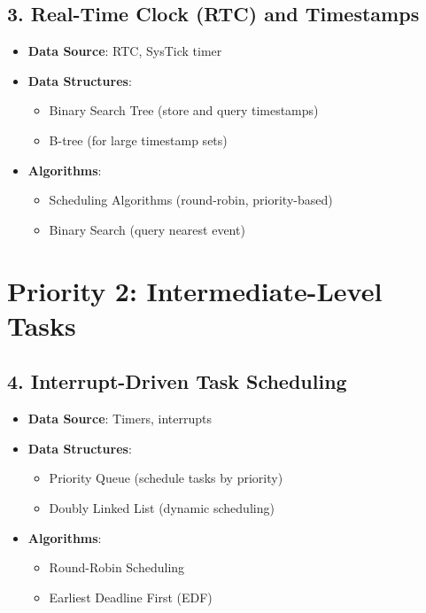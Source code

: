 \documentclass{article}
\begin{document}
\subsection{3. Real-Time Clock (RTC) and Timestamps}
\begin{itemize}
    \item \textbf{Data Source}: RTC, SysTick timer
    \item \textbf{Data Structures}:
    \begin{itemize}
        \item Binary Search Tree (store and query timestamps)
        \item B-tree (for large timestamp sets)
    \end{itemize}
    \item \textbf{Algorithms}:
    \begin{itemize}
        \item Scheduling Algorithms (round-robin, priority-based)
        \item Binary Search (query nearest event)
    \end{itemize}
\end{itemize}

\section{Priority 2: Intermediate-Level Tasks}

\subsection{4. Interrupt-Driven Task Scheduling}
\begin{itemize}
    \item \textbf{Data Source}: Timers, interrupts
    \item \textbf{Data Structures}:
    \begin{itemize}
        \item Priority Queue (schedule tasks by priority)
        \item Doubly Linked List (dynamic scheduling)
    \end{itemize}
    \item \textbf{Algorithms}:
    \begin{itemize}
        \item Round-Robin Scheduling
        \item Earliest Deadline First (EDF)
    \end{itemize}
\end{itemize}
\end{document}
